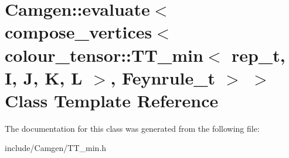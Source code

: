 \hypertarget{a00176}{\section{Camgen\-:\-:evaluate$<$ compose\-\_\-vertices$<$ colour\-\_\-tensor\-:\-:T\-T\-\_\-min$<$ rep\-\_\-t, I, J, K, L $>$, Feynrule\-\_\-t $>$ $>$ Class Template Reference}
\label{a00176}
}


The documentation for this class was generated from the following file\-:\begin{DoxyCompactItemize}
\item 
include/\-Camgen/T\-T\-\_\-min.\-h\end{DoxyCompactItemize}
